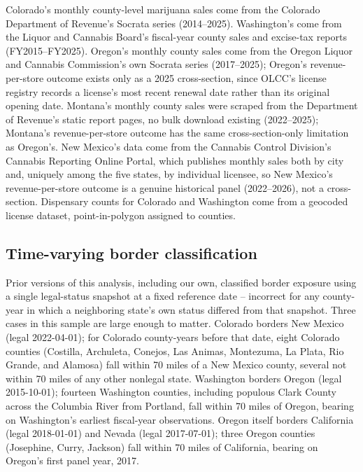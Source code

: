 \documentclass[12pt]{article}
\begin{document}
Colorado's monthly county-level marijuana sales come from the Colorado Department of Revenue's Socrata series
(2014--2025). Washington's come from the Liquor and Cannabis Board's fiscal-year county sales and excise-tax
reports (FY2015--FY2025). Oregon's monthly county sales come from the Oregon Liquor and Cannabis Commission's
own Socrata series (2017--2025); Oregon's revenue-per-store outcome exists only as a 2025 cross-section, since
OLCC's license registry records a license's most recent renewal date rather than its original opening date.
Montana's monthly county sales were scraped from the Department of Revenue's static report pages, no bulk
download existing (2022--2025); Montana's revenue-per-store outcome has the same cross-section-only limitation
as Oregon's. New Mexico's data come from the Cannabis Control Division's Cannabis Reporting Online Portal,
which publishes monthly sales both by city and, uniquely among the five states, by individual licensee, so
New Mexico's revenue-per-store outcome is a genuine historical panel (2022--2026), not a cross-section.
Dispensary counts for Colorado and Washington come from a geocoded license dataset, point-in-polygon assigned
to counties.

\subsection{Time-varying border classification}
\label{sec:timevarying}

Prior versions of this analysis, including our own, classified border exposure using a single legal-status
snapshot at a fixed reference date -- incorrect for any county-year in which a neighboring state's own status
differed from that snapshot. Three cases in this sample are large enough to matter. Colorado borders New
Mexico (legal 2022-04-01); for Colorado county-years before that date, eight Colorado counties (Costilla,
Archuleta, Conejos, Las Animas, Montezuma, La Plata, Rio Grande, and Alamosa) fall within 70 miles of a New
Mexico county, several not within 70 miles of any other nonlegal state. Washington borders Oregon (legal
2015-10-01); fourteen Washington counties, including populous Clark County across the Columbia River from
Portland, fall within 70 miles of Oregon, bearing on Washington's earliest fiscal-year observations. Oregon
itself borders California (legal 2018-01-01) and Nevada (legal 2017-07-01); three Oregon counties (Josephine,
Curry, Jackson) fall within 70 miles of California, bearing on Oregon's first panel year, 2017.
\end{document}

